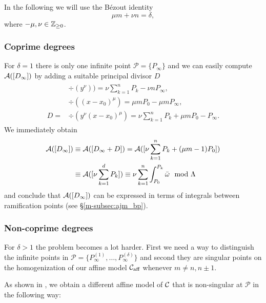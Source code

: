\documentclass[main.tex]{subfiles}
\begin{document}
  In the following we will use the Bézout identity
  \begin{equation}
    \mu m + \nu n = \delta,
  \end{equation}
  where $-\mu,\nu \in \mathbb{Z}_{\ge 0}$.
  
  
  \subsubsection{Coprime degrees}
  
  For $\delta = 1$ there is only one infinite point $\mathcal{P} = \{ P_{\infty} \}$ and
  we can easily compute  $\mathcal{A}( [D_{\infty}] )$ by adding a suitable
  principal divisor $D$
    \begin{align}
     \begin{split}
      &\div(y^{\nu}) ) =  \nu \sum_{k = 1}^n P_k - \nu n P_{\infty},\\
      &\div((x-x_0)^{\mu})  =  \mu m P_0 - \mu m P_{\infty} ,\\
      D  =  & \div(y^{\nu}(x-x_0)^{\mu})  = \nu \sum_{k = 1}^n P_k + \mu m P_0 - P_{\infty}.
     \end{split}
    \end{align}
    We immediately obtain
    \begin{align}
     \mathcal{A}( [D_{\infty}] )  & \equiv  \mathcal{A}([D_{\infty} + D])  =  \mathcal{A}( [ \nu \sum_{k = 1}^n P_k + (\mu m - 1) P_0 ]  ) \\  & \equiv  \mathcal{A}( [ \nu \sum_{k = 1}^d P_k ] )
      \equiv   \nu \sum_{k=1}^n \int_{P_0}^{P_k} \bar{\omega} \mod \Lambda
    \end{align}
    and conclude that $\mathcal{A}( [D_{\infty}] )$ can be expressed in terms of integrals between
    ramification points (see \S \ref{m-subsec:ajm_bp}).
   
 \subsubsection{Non-coprime degrees}

  For $\delta > 1$ the problem becomes a lot harder. First we need a way to distinguish the infinite points in $\mathcal{P}
  = \{ P_{\infty}^{(1)},\dots, P_{\infty}^{(\delta)} \}$ and second they are singular points
  on the homogenization of our affine model $\mathcal{C}_{\text{aff}}$
  whenever $m \ne n,n\pm1$.
  
  As shown in \cite[\S 1]{CT1996}, we obtain a different affine model of $\mathcal{C}$ that is non-singular at $\mathcal{P}$
  in the following way:
  
\end{document}
